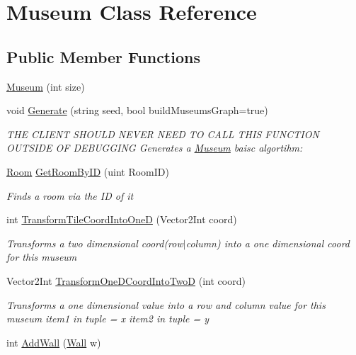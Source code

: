 \hypertarget{class_museum}{}\section{Museum Class Reference}
\label{class_museum}
\subsection*{Public Member Functions}
\begin{DoxyCompactItemize}
\item 
\mbox{\hyperlink{class_museum_aa946df02a55ba522f7a39ac688648733}{Museum}} (int size)
\item 
void \mbox{\hyperlink{class_museum_a2a301b4e27f35da164ffa03b3d3d7e81}{Generate}} (string seed, bool build\+Museums\+Graph=true)
\begin{DoxyCompactList}\small\item\em T\+HE C\+L\+I\+E\+NT S\+H\+O\+U\+LD N\+E\+V\+ER N\+E\+ED TO C\+A\+LL T\+H\+IS F\+U\+N\+C\+T\+I\+ON O\+U\+T\+S\+I\+DE OF D\+E\+B\+U\+G\+G\+I\+NG Generates a \mbox{\hyperlink{class_museum}{Museum}} baisc algortihm\+: \end{DoxyCompactList}\item 
\mbox{\hyperlink{class_room}{Room}} \mbox{\hyperlink{class_museum_a31c3e63a3a1e2edf6e219cb1f04b9515}{Get\+Room\+By\+ID}} (uint Room\+ID)
\begin{DoxyCompactList}\small\item\em Finds a room via the ID of it \end{DoxyCompactList}\item 
int \mbox{\hyperlink{class_museum_a405e60db962417dde46d46180cbf81df}{Transform\+Tile\+Coord\+Into\+OneD}} (Vector2\+Int coord)
\begin{DoxyCompactList}\small\item\em Transforms a two dimensional coord(row$\vert$column) into a one dimensional coord for this museum \end{DoxyCompactList}\item 
Vector2\+Int \mbox{\hyperlink{class_museum_a458545a518b026779c23e6c5b477bbf4}{Transform\+One\+D\+Coord\+Into\+TwoD}} (int coord)
\begin{DoxyCompactList}\small\item\em Transforms a one dimensional value into a row and column value for this museum item1 in tuple = x item2 in tuple = y \end{DoxyCompactList}\item 
int \mbox{\hyperlink{class_museum_a6e441db98efeaa314ae974222aea08e6}{Add\+Wall}} (\mbox{\hyperlink{class_wall}{Wall}} w)

\end{DoxyCompactItemize}
